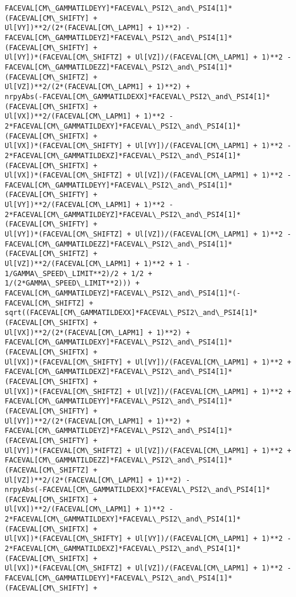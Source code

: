 \documentclass[landscape,letterpaper,10pt,english]{article}
\begin{document}
\begin{Verbatim}[commandchars=\\\{\}]
FACEVAL[CM\_GAMMATILDEYY]*FACEVAL\_PSI2\_and\_PSI4[1]*(FACEVAL[CM\_SHIFTY] +
Ul[VY])**2/(2*(FACEVAL[CM\_LAPM1] + 1)**2) -
FACEVAL[CM\_GAMMATILDEYZ]*FACEVAL\_PSI2\_and\_PSI4[1]*(FACEVAL[CM\_SHIFTY] +
Ul[VY])*(FACEVAL[CM\_SHIFTZ] + Ul[VZ])/(FACEVAL[CM\_LAPM1] + 1)**2 -
FACEVAL[CM\_GAMMATILDEZZ]*FACEVAL\_PSI2\_and\_PSI4[1]*(FACEVAL[CM\_SHIFTZ] +
Ul[VZ])**2/(2*(FACEVAL[CM\_LAPM1] + 1)**2) +
nrpyAbs(-FACEVAL[CM\_GAMMATILDEXX]*FACEVAL\_PSI2\_and\_PSI4[1]*(FACEVAL[CM\_SHIFTX] +
Ul[VX])**2/(FACEVAL[CM\_LAPM1] + 1)**2 -
2*FACEVAL[CM\_GAMMATILDEXY]*FACEVAL\_PSI2\_and\_PSI4[1]*(FACEVAL[CM\_SHIFTX] +
Ul[VX])*(FACEVAL[CM\_SHIFTY] + Ul[VY])/(FACEVAL[CM\_LAPM1] + 1)**2 -
2*FACEVAL[CM\_GAMMATILDEXZ]*FACEVAL\_PSI2\_and\_PSI4[1]*(FACEVAL[CM\_SHIFTX] +
Ul[VX])*(FACEVAL[CM\_SHIFTZ] + Ul[VZ])/(FACEVAL[CM\_LAPM1] + 1)**2 -
FACEVAL[CM\_GAMMATILDEYY]*FACEVAL\_PSI2\_and\_PSI4[1]*(FACEVAL[CM\_SHIFTY] +
Ul[VY])**2/(FACEVAL[CM\_LAPM1] + 1)**2 -
2*FACEVAL[CM\_GAMMATILDEYZ]*FACEVAL\_PSI2\_and\_PSI4[1]*(FACEVAL[CM\_SHIFTY] +
Ul[VY])*(FACEVAL[CM\_SHIFTZ] + Ul[VZ])/(FACEVAL[CM\_LAPM1] + 1)**2 -
FACEVAL[CM\_GAMMATILDEZZ]*FACEVAL\_PSI2\_and\_PSI4[1]*(FACEVAL[CM\_SHIFTZ] +
Ul[VZ])**2/(FACEVAL[CM\_LAPM1] + 1)**2 + 1 - 1/GAMMA\_SPEED\_LIMIT**2)/2 + 1/2 +
1/(2*GAMMA\_SPEED\_LIMIT**2))) +
FACEVAL[CM\_GAMMATILDEYZ]*FACEVAL\_PSI2\_and\_PSI4[1]*(-FACEVAL[CM\_SHIFTZ] +
sqrt((FACEVAL[CM\_GAMMATILDEXX]*FACEVAL\_PSI2\_and\_PSI4[1]*(FACEVAL[CM\_SHIFTX] +
Ul[VX])**2/(2*(FACEVAL[CM\_LAPM1] + 1)**2) +
FACEVAL[CM\_GAMMATILDEXY]*FACEVAL\_PSI2\_and\_PSI4[1]*(FACEVAL[CM\_SHIFTX] +
Ul[VX])*(FACEVAL[CM\_SHIFTY] + Ul[VY])/(FACEVAL[CM\_LAPM1] + 1)**2 +
FACEVAL[CM\_GAMMATILDEXZ]*FACEVAL\_PSI2\_and\_PSI4[1]*(FACEVAL[CM\_SHIFTX] +
Ul[VX])*(FACEVAL[CM\_SHIFTZ] + Ul[VZ])/(FACEVAL[CM\_LAPM1] + 1)**2 +
FACEVAL[CM\_GAMMATILDEYY]*FACEVAL\_PSI2\_and\_PSI4[1]*(FACEVAL[CM\_SHIFTY] +
Ul[VY])**2/(2*(FACEVAL[CM\_LAPM1] + 1)**2) +
FACEVAL[CM\_GAMMATILDEYZ]*FACEVAL\_PSI2\_and\_PSI4[1]*(FACEVAL[CM\_SHIFTY] +
Ul[VY])*(FACEVAL[CM\_SHIFTZ] + Ul[VZ])/(FACEVAL[CM\_LAPM1] + 1)**2 +
FACEVAL[CM\_GAMMATILDEZZ]*FACEVAL\_PSI2\_and\_PSI4[1]*(FACEVAL[CM\_SHIFTZ] +
Ul[VZ])**2/(2*(FACEVAL[CM\_LAPM1] + 1)**2) -
nrpyAbs(-FACEVAL[CM\_GAMMATILDEXX]*FACEVAL\_PSI2\_and\_PSI4[1]*(FACEVAL[CM\_SHIFTX] +
Ul[VX])**2/(FACEVAL[CM\_LAPM1] + 1)**2 -
2*FACEVAL[CM\_GAMMATILDEXY]*FACEVAL\_PSI2\_and\_PSI4[1]*(FACEVAL[CM\_SHIFTX] +
Ul[VX])*(FACEVAL[CM\_SHIFTY] + Ul[VY])/(FACEVAL[CM\_LAPM1] + 1)**2 -
2*FACEVAL[CM\_GAMMATILDEXZ]*FACEVAL\_PSI2\_and\_PSI4[1]*(FACEVAL[CM\_SHIFTX] +
Ul[VX])*(FACEVAL[CM\_SHIFTZ] + Ul[VZ])/(FACEVAL[CM\_LAPM1] + 1)**2 -
FACEVAL[CM\_GAMMATILDEYY]*FACEVAL\_PSI2\_and\_PSI4[1]*(FACEVAL[CM\_SHIFTY] +

\end{Verbatim}
\end{document}
